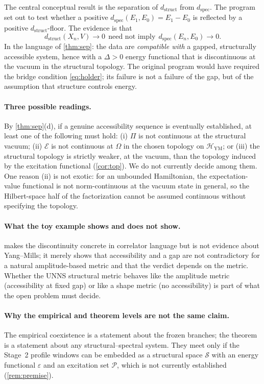 \documentclass[11pt,a4paper]{article}
\theoremstyle{definition}
\theoremstyle{remark}
\newcommand{\dstruct}{d_{\mathrm{struct}}}
\newcommand{\dspec}{d_{\mathrm{spec}}}
\newcommand{\HYM}{\mathcal{H}_{\mathrm{YM}}}
\newcommand{\Pset}{\mathcal{P}}
\newcommand{\uns}{UNNS}
\begin{document}
The central conceptual result is the separation of $\dstruct$ from $\dspec$. The program set out to test whether a positive $\dspec(E_1,E_0)=E_1-E_0$ is reflected by a positive $\dstruct$-floor. The evidence is that
\begin{equation}
\dstruct(X_n,V)\to0\ \ \text{need not imply}\ \ \dspec(E_n,E_0)\to0 .
\end{equation}
In the language of \cref{thm:sep}: the data are \emph{compatible with} a gapped, structurally accessible system, hence with a $\Delta>0$ energy functional that is discontinuous at the vacuum in the structural topology. The original program would have required the bridge condition \eqref{eq:holder}; its failure is not a failure of the gap, but of the assumption that structure controls energy.

\paragraph{Three possible readings.} By \cref{thm:sep}(d), if a genuine accessibility sequence is eventually established, at least one of the following must hold: (i) $\Pi$ is not continuous at the structural vacuum; (ii) $\mathcal E$ is not continuous at $\Omega$ in the chosen topology on $\HYM$; or (iii) the structural topology is strictly weaker, at the vacuum, than the topology induced by the excitation functional (\cref{cor:top}). We do not currently decide among them. One reason (ii) is not exotic: for an unbounded Hamiltonian, the expectation-value functional is not norm-continuous at the vacuum state in general, so the Hilbert-space half of the factorization cannot be assumed continuous without specifying the topology.

\paragraph{What the toy example shows and does not show.}  makes the discontinuity concrete in correlator language but is not evidence about Yang--Mills; it merely shows that accessibility and a gap are not contradictory for a natural amplitude-based metric and that the verdict depends on the metric. Whether the \uns{} structural metric behaves like the amplitude metric (accessibility at fixed gap) or like a shape metric (no accessibility) is part of what the open problem must decide.

\paragraph{Why the empirical and theorem levels are not the same claim.} The empirical coexistence is a statement about the frozen branches; the theorem is a statement about any structural--spectral system. They meet only if the Stage~2 profile windows can be embedded as a structural space $\mathcal S$ with an energy functional $\varepsilon$ and an excitation set $\Pset$, which is not currently established (\cref{rem:premise}).
\end{document}

